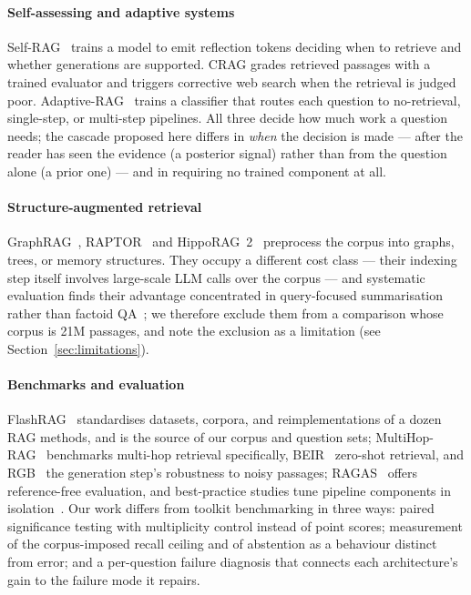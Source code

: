 \paragraph{Self-assessing and adaptive systems}
Self-RAG~\citep{asai2024selfrag} trains a model to emit reflection tokens
deciding when to retrieve and whether generations are supported. CRAG
\citep{yan2024crag} grades retrieved passages with a trained evaluator and
triggers corrective web search when the retrieval is judged poor.
Adaptive-RAG~\citep{jeong2024adaptiverag} trains a classifier that routes
each question to no-retrieval, single-step, or multi-step pipelines. All
three decide how much work a question needs; the cascade proposed here
differs in \emph{when} the decision is made --- after the reader has seen
the evidence (a posterior signal) rather than from the question alone (a
prior one) --- and in requiring no trained component at all.

\paragraph{Structure-augmented retrieval}
GraphRAG~\citep{edge2024graphrag}, RAPTOR~\citep{sarthi2024raptor} and
HippoRAG~2~\citep{gutierrez2025hipporag2} preprocess the corpus into graphs,
trees, or memory structures. They occupy a different cost class --- their
indexing step itself involves large-scale LLM calls over the corpus --- and
systematic evaluation finds their advantage concentrated in query-focused
summarisation rather than factoid QA~\citep{han2025ragvsgraphrag}; we
therefore exclude them from a comparison whose corpus is 21M passages, and
note the exclusion as a limitation (see Section~\ref{sec:limitations}).

\paragraph{Benchmarks and evaluation}
FlashRAG~\citep{jin2024flashrag} standardises datasets, corpora, and
reimplementations of a dozen RAG methods, and is the source of our corpus
and question sets; MultiHop-RAG~\citep{tang2024multihoprag} benchmarks
multi-hop retrieval specifically, BEIR~\citep{thakur2021beir} zero-shot
retrieval, and RGB~\citep{chen2024benchmarking} the generation step's
robustness to noisy passages; RAGAS~\citep{es2024ragas} offers
reference-free evaluation, and best-practice studies tune pipeline
components in isolation~\citep{wang2024bestpractices}. Our work differs
from toolkit
benchmarking in three ways: paired significance testing with multiplicity
control instead of point scores; measurement of the corpus-imposed recall
ceiling and of abstention as a behaviour distinct from error; and a
per-question failure diagnosis that connects each architecture's gain to
the failure mode it repairs.

